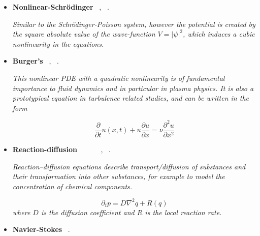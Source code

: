 \documentclass[12pt,letterpaper]{article}
\begin{document}
\begin{itemize}
\begin{itemize}
\begin{itemize}
                    \textit{Similar to the Vlasov-Poisson system, the Schrödinger-Poisson equation attempts to describe the self-consistent evolution of a wave-function and a potential.}

                    \item \textbf{Nonlinear-Schrödinger}  ~\cite{garcia-molinaQuantumFourierAnalysis2022}, ~\cite{lubaschVariationalQuantumAlgorithms2020}.
                    
                    \textit{Similar to the Schrödinger-Poisson system, however the potential is created by the square absolute value of the wave-function $V=|\psi|^2$, which induces a cubic nonlinearity in the equations.}
                    
                   \item \textbf{Burger's}  ~\cite{zylbermanHybridQuantumClassicalAlgorithm2022},  ~\cite{ozSolvingBurgersEquation2021}.
                   
                   \textit{This nonlinear PDE with a quadratic nonlinearity is of fundamental importance to fluid dynamics and in particular in plasma physics. It is also a prototypical equation in turbulence related studies, and can be written in the form}

                   $$\dfrac{\partial }{\partial t} u(x,t) +u \dfrac{\partial u}{\partial x} = \nu \dfrac{\partial^2 u}{\partial x^2}$$
       
    			\item \textbf{Reaction-diffusion} ~ ~\cite{leongVariationalQuantumEvolution2022} ~ ~\cite{demirdjianVariationalQuantumSolutions2022},  ~\cite{anEfficientQuantumAlgorithm2022}.
       
                \textit{Reaction–diffusion equations describe transport/diffusion of substances and their transformation into other substances, for example to model the concentration of chemical components.}
                
                $$ \partial_t p = D \nabla^2 q + R(q)$$
                \textit{where $D$ is the diffusion coefficient and $R$ is the local reaction rate.}       
    
                \item \textbf{Navier-Stokes}  ~\cite{gaitanFindingFlowsNavier2020}.
                

\end{itemize}
\end{itemize}
\end{itemize}
\end{document}
